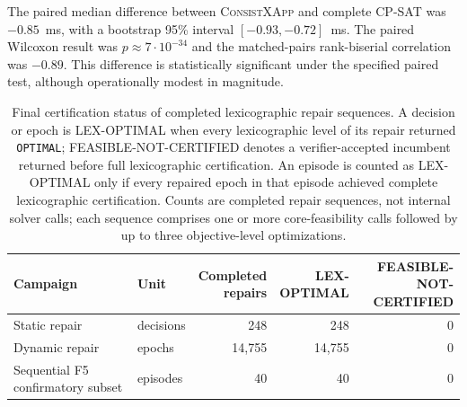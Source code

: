 \documentclass[pdflatex,sn-mathphys-num,iicol,oneside]{sn-jnl}
\newcommand{\method}{\textsc{ConsistXApp}\xspace}
\newcommand{\cpsat}{\textsc{CP-SAT}\xspace}
\begin{document}
The paired median difference between \method and complete \cpsat was
$-0.85$~ms, with a bootstrap 95\% interval
$[-0.93,-0.72]$~ms. The paired Wilcoxon result was
$p\approx 7\cdot 10^{-34}$ and the matched-pairs rank-biserial correlation was $-0.89$.
This difference is statistically significant under the specified paired test, although operationally modest in magnitude.

\begin{table}[t]
\centering
\caption{
Final certification status of completed lexicographic repair
sequences. A decision or epoch is LEX-OPTIMAL when every
lexicographic level of its repair returned \texttt{OPTIMAL};
FEASIBLE-NOT-CERTIFIED denotes a verifier-accepted incumbent
returned before full lexicographic certification. An episode is
counted as LEX-OPTIMAL only if every repaired epoch in that episode
achieved complete lexicographic certification. Counts are completed
repair sequences, not internal solver calls; each sequence comprises
one or more core-feasibility calls followed by up to three
objective-level optimizations.
}
\label{tab:epoch-status}
\setlength{\tabcolsep}{4pt}
\small
\begin{tabular}{llrrr}
\toprule
Campaign & Unit & \shortstack[l]{Completed\\repairs} & \shortstack[l]{LEX-\\OPTIMAL} & \shortstack[l]{FEASIBLE-NOT-\\CERTIFIED} \\
\midrule
Static repair & decisions & 248 & 248 & 0 \\
Dynamic repair & epochs & 14{,}755 & 14{,}755 & 0 \\
Sequential F5 confirmatory subset & episodes & 40 & 40 & 0 \\
\bottomrule
\end{tabular}
\end{table}
\end{document}
